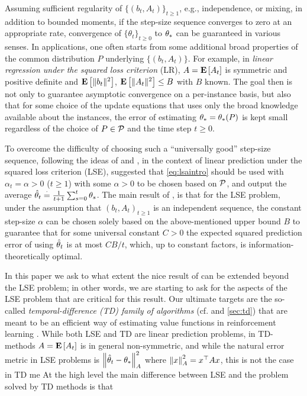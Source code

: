 Assuming sufficient regularity of $\{(b_t,A_t)\}_{t\ge 1}$, e.g., independence, or mixing, in addition to bounded moments, if the step-size sequence converges to zero at an appropriate rate,
convergence of $\{\theta_t\}_{t\ge 0}$ to $\theta_*$ can be guaranteed in various senses. 
In applications, one often starts from some additional broad properties of the common distribution
$P$ underlying $\{(b_t,A_t)\}$.
For example, in \emph{linear regression under the squared loss criterion} (LR),
$A= \mathbf{E}\left[A_t\right]$ is symmetric and positive definite and $\mathbf{E}\left[\| b_t\|^2\right]$, $\mathbf{E}\left[\| A_t\|^2\right]\le B$ with $B$ known.
The goal then is not only to guarantee asymptotic convergence on a per-instance basis, 
but also that for some choice of the update equations that uses only the broad knowledge available
about the instances,
the error of estimating $\theta_* = \theta_*(P)$ is kept small regardless of the choice of $P\in \mathcal{P}$ and the time step $t\ge 0$.

To overcome the difficulty of choosing such a ``universally good'' step-size sequence,
following the ideas of \citet{ruppert} and \citet{polyak-judisky},
in the context of linear prediction under the squared loss criterion (LSE),
\citet{bach-moulines} suggested that
\eqref{eq:lsaintro} should be used with $\alpha_t=\alpha>0$ ($t\ge 1$) 
with some $\alpha>0$ to be chosen based on $\mathcal{P}$, 
and output the average $\hat{\theta}_t\stackrel{\cdot}{=}\frac{1}{t+1}\sum_{s=0}^t \theta_s$. 
The main result of 
\citet{bach-moulines}, 
is that for the LSE problem, 
under the assumption that $(b_t,A_t)_{t\ge 1}$ is an independent sequence, 
the constant step-size $\alpha$ can be chosen solely based on the above-mentioned 
upper bound $B$ to guarantee that for some universal constant $C>0$
the expected squared prediction error of using $\hat{\theta}_t$ is at most $C B/t$,
which, up to constant factors, is information-theoretically optimal.

In this paper we ask to what extent the nice result 
of \citet{bach-moulines} can be extended beyond the LSE problem;
in other words, we are starting to ask for the aspects of the LSE problem that are
critical for this result. Our ultimate targets are the so-called
\emph{temporal-difference (TD) family of algorithms} (cf. \cite{sutton,gtd,gtd2,gtdmp}
and \cref{sec:td}) that are meant to be an efficient way of estimating value functions
in reinforcement learning \cite[e.g.,][]{sutton,konda-tsitsiklis,KoTsi03LSA,gtd,gtd2,gtdmp}.
While both LSE and TD are linear prediction problems, 
in TD-methods $A=\mathbf{E}\left[A_t\right]$ is in general non-symmetric, 
and while the natural error metric in LSE problems is $\left\| \hat{\theta}_t-\theta_*\right\|_{A}^2$
where $\left\| x\right\|_A^2 = x^\top A x$,
this is not the case in TD me
At the high level 
the main difference between LSE and the problem solved by TD methods
is that

